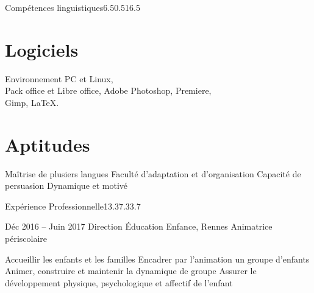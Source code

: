 \documentclass[30pt, french]{tccv}
\begin{document}
\begin{upshape}
\begin{rounded_frame}{Compétences linguistiques}{6.5}{0.5}{16.5}{}
\vspace{0.5cm}
\section{Logiciels}
Environnement PC et Linux, \\
Pack office et Libre office,
Adobe Photoshop, Premiere, \\
Gimp,
\LaTeX.

\vspace{0.5cm}
\section{Aptitudes}
\begin{itemize}[leftmargin=13pt]
  \setlength\itemsep{-3pt} 
  \cvitem[\checkmark]  Maîtrise de plusiers langues
  \cvitem[\checkmark]  Faculté d'adaptation et d'organisation
  \cvitem[\checkmark]  Capacité de persuasion
  \cvitem[\checkmark]  Dynamique et motivé
\end{itemize}

\vspace{0.3cm}

\end{rounded_frame}




%
%


\begin{flat_frame}{Expérience Professionnelle}{13.3}{7.3}{3.7}{}
\begin{eventlist}


    
    
    
\item{Déc 2016 -- Juin 2017}
     {Direction Éducation Enfance, Rennes}
     {Animatrice périscolaire}
     \fontsize{9pt}{1em}\color{text}\bodyfontlight\upshape\selectfont
    
    \begin{itemize}
      \cvitem[\checkmark] Accueillir les enfants et les familles                      
      \cvitem[\checkmark] Encadrer par l’animation un groupe d’enfants
      \cvitem[\checkmark] Animer, construire et maintenir la dynamique de groupe               
      \cvitem[\checkmark] Assurer le développement physique, psychologique et affectif de l’enfant                                            
    \end{itemize}     





\end{eventlist}
\end{flat_frame}
\end{upshape}
\end{document}
